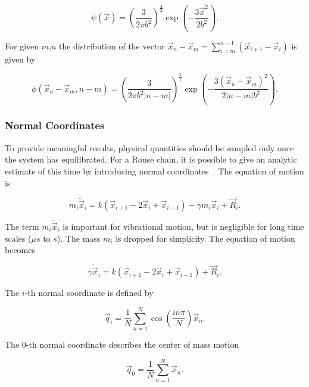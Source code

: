 \documentclass[a4paper]{article}
\begin{document}
\begin{equation}
\psi(\vec{x}) = \left( \frac{3}{2 \pi b^2} \right)^{\frac{3}{2}} \exp \left(- \frac{3 \vec{x}^2}{2 b^2} \right).
\label{eq:distribution-rouse}
\end{equation}

For given $m$,$n$ the distribution of the vector $\vec{x}_n - \vec{x}_m = \sum_{i=m}^{n-1} (\vec{x}_{i+1} - \vec{x}_i)$ is given by

\begin{equation}
\phi(\vec{x}_n - \vec{x}_m, n-m) = \left( \frac{3}{2 \pi b^2 |n-m|} \right)^{\frac{3}{2}} \exp \left(- \frac{3 (\vec{x}_n - \vec{x}_m)^2}{2 |n-m| b^2} \right).
\label{eq:distribution2-rouse}
\end{equation}

\subsubsection{Normal Coordinates}

To provide meaningful results, physical quantities should be sampled only once the system has equilibrated. For a Rouse chain, it is possible to give an analytic estimate of this time by introducing normal coordinates~\cite{Teraok2002}. The equation of motion is

\begin{equation}
m_i \ddot{\vec{x}}_i = k (\vec{x}_{i+1} - 2 \vec{x}_i + \vec{x}_{i-1}) - \gamma m_i \dot{\vec{x}}_i + \vec{R}_i.
\end{equation}

The term $m_i \ddot{\vec{x}}_i$ is important for vibrational motion, but is negligible for long time scales ($\mu s$ to $s$). The mass $m_i$ is dropped for simplicity. The equation of motion becomes

\begin{equation}
\gamma \dot{\vec{x}}_i = k (\vec{x}_{i+1} - 2 \vec{x}_i + \vec{x}_{i-1}) + \vec{R}_i.
\end{equation}

The $i$-th normal coordinate is defined by

\begin{equation}
\vec{q}_i = \frac{1}{N} \sum_{n=1}^N \cos \left( \frac{i n \pi}{N} \right) \vec{x}_n.
\end{equation}

The $0$-th normal coordinate describes the center of mass motion

\begin{equation}
\vec{q}_0 = \frac{1}{N} \sum_{n=1}^N \vec{x}_n.
\end{equation}
\end{document}
